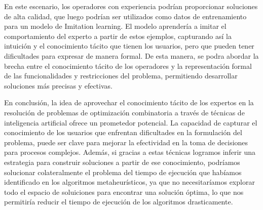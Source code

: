 En este escenario, los operadores con experiencia podrían proporcionar soluciones de alta calidad, que luego 
podrían ser utilizados como datos de entrenamiento para un modelo de Imitation learning. El modelo aprendería 
a imitar el comportamiento del experto a partir de estos ejemplos, capturando así la intuición y el conocimiento 
tácito que tienen los usuarios, pero que pueden tener dificultades para expresar de manera formal. De esta manera, 
se podra abordar la brecha entre el conocimiento tácito de los operadores y la representación formal de las 
funcionalidades y restricciones del problema, permitiendo desarrollar soluciones más precisas y efectivas.\medskip

En conclusión, la idea de aprovechar el conocimiento tácito de los expertos en la resolución de problemas de 
optimización combinatoria a través de técnicas de inteligencia artificial ofrece un prometedor potencial. La 
capacidad de capturar el conocimiento de los usuarios que enfrentan dificultades en la formulación
del problema, puede ser clave para mejorar la efectividad en la toma de decisiones para procesos complejos. Además,
si gracias a estas técnicas logramos inferir una estrategia para construir soluciones a partir de ese conocimiento,
podríamos solucionar colateralmente el problema del tiempo de ejecución que habíamos identificado en los algoritmos 
metaheurísticos, ya que no necesitaríamos explorar todo el espacio de soluiciones para encontrar una solución óptima,
lo que nos permitiría reducir el tiempo de ejecución de los algoritmos drasticamente.



\pagebreak